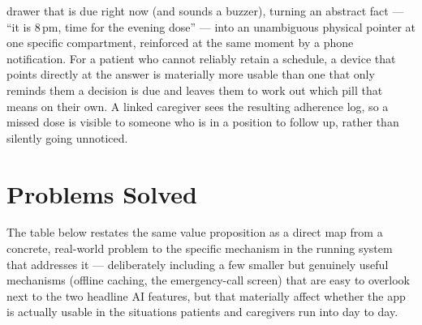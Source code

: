 \documentclass[12pt,a4paper]{report}
\begin{document}
\begin{itemize}[leftmargin=1.4em]
  drawer that is due right now (and sounds a buzzer), turning an abstract fact
  --- ``it is 8\,pm, time for the evening dose'' --- into an unambiguous
  physical pointer at one specific compartment, reinforced at the same moment
  by a phone notification. For a patient who cannot reliably retain a
  schedule, a device that points directly at the answer is materially more
  usable than one that only reminds them a decision is due and leaves them to
  work out which pill that means on their own. A linked caregiver sees the
  resulting adherence log, so a missed dose is visible to someone who is in a
  position to follow up, rather than silently going unnoticed.
\end{itemize}

\section{Problems Solved}

The table below restates the same value proposition as a direct map from a
concrete, real-world problem to the specific mechanism in the running system
that addresses it --- deliberately including a few smaller but genuinely useful
mechanisms (offline caching, the emergency-call screen) that are easy to
overlook next to the two headline AI features, but that materially affect
whether the app is actually usable in the situations patients and caregivers
run into day to day.
\end{document}
